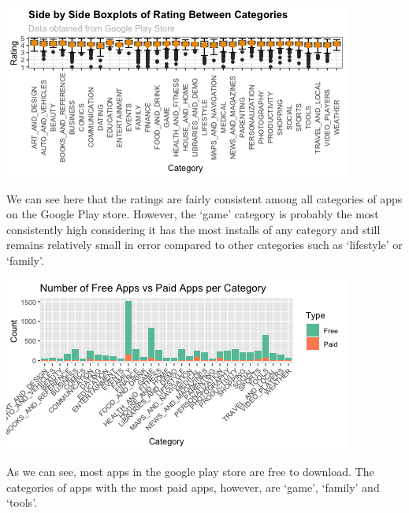 \documentclass[11pt,preprint, authoryear]{elsarticle}
\let\origfigure\figure
\let\endorigfigure\endfigure
\renewenvironment{figure}[1][2] {
    \expandafter\origfigure\expandafter[H]
} {
    \endorigfigure
}
\numberwithin{equation}{section}
\numberwithin{figure}{section}
\numberwithin{table}{section}
\begin{document}
\begin{figure}[H]

{\centering \includegraphics{q5_files/figure-latex/Figure3-1} 

}

\caption{Ratings of Applications based on Categories \label{Figure3}}\label{fig:Figure3}
\end{figure}

We can see here that the ratings are fairly consistent among all
categories of apps on the Google Play store. However, the `game'
category is probably the most consistently high considering it has the
most installs of any category and still remains relatively small in
error compared to other categories such as `lifestyle' or `family'.

\begin{figure}[H]

{\centering \includegraphics{q5_files/figure-latex/Figure4-1} 

}

\caption{Number of Free vs Paid Apps Per Category \label{Figure4}}\label{fig:Figure4}
\end{figure}

As we can see, most apps in the google play store are free to download.
The categories of apps with the most paid apps, however, are `game',
`family' and `tools'.
\end{document}
